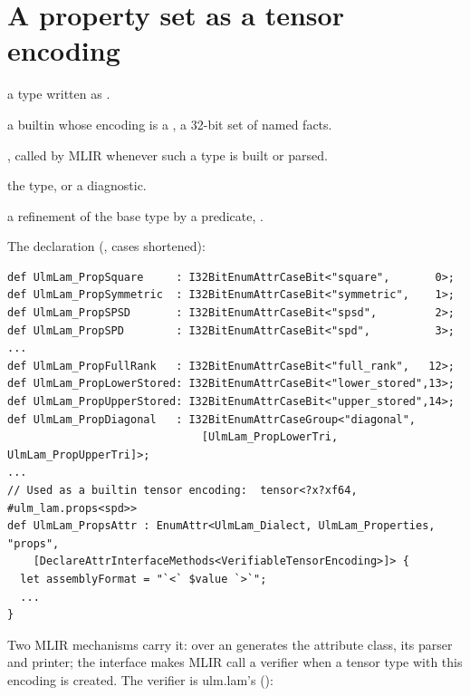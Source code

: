 \section{A property set as a tensor encoding}
\label{sec:infra-props}

\begin{steps}
\item[Input] a type written as .
\item[Representation] a builtin  whose encoding is a , a 32-bit set of named facts.
\item[Rule] , called by MLIR whenever such a type is built or parsed.
\item[Output] the type, or a diagnostic.
\item[Theory] a refinement of the base type by a predicate, .
\end{steps}

The declaration (, cases
shortened):

\begin{lstlisting}[style=td]
def UlmLam_PropSquare     : I32BitEnumAttrCaseBit<"square",       0>;
def UlmLam_PropSymmetric  : I32BitEnumAttrCaseBit<"symmetric",    1>;
def UlmLam_PropSPSD       : I32BitEnumAttrCaseBit<"spsd",         2>;
def UlmLam_PropSPD        : I32BitEnumAttrCaseBit<"spd",          3>;
...
def UlmLam_PropFullRank   : I32BitEnumAttrCaseBit<"full_rank",   12>;
def UlmLam_PropLowerStored: I32BitEnumAttrCaseBit<"lower_stored",13>;
def UlmLam_PropUpperStored: I32BitEnumAttrCaseBit<"upper_stored",14>;
def UlmLam_PropDiagonal   : I32BitEnumAttrCaseGroup<"diagonal",
                              [UlmLam_PropLowerTri, UlmLam_PropUpperTri]>;
...
// Used as a builtin tensor encoding:  tensor<?x?xf64, #ulm_lam.props<spd>>
def UlmLam_PropsAttr : EnumAttr<UlmLam_Dialect, UlmLam_Properties, "props",
    [DeclareAttrInterfaceMethods<VerifiableTensorEncoding>]> {
  let assemblyFormat = "`<` $value `>`";
  ...
}
\end{lstlisting}

Two MLIR mechanisms carry it:  over an 
generates the attribute class, its parser and printer; the interface
 makes MLIR call a verifier when a tensor
type with this encoding is created. The verifier is ulm.lam's
():

